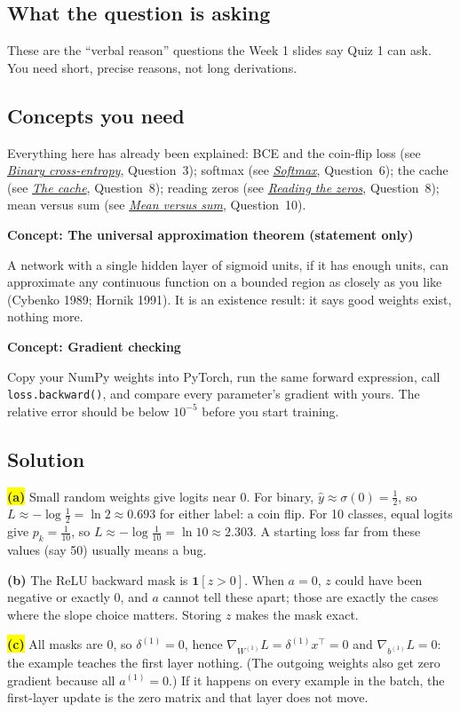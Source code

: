 \documentclass[12pt,a4paper]{article}
\newcommand{\concept}[2]{\par\medskip\phantomsection\label{#1}{\large\bfseries\color{blue!50!black} Concept: #2}\par}
\newcommand{\seeconcept}[3]{(see \hyperref[#1]{\textit{#2}}, Question~#3)}
\newcommand{\hlq}[1]{{\setlength{\fboxsep}{1.5pt}\colorbox{yellow}{#1}}}
\begin{document}
\subsection*{What the question is asking}
These are the ``verbal reason'' questions the Week 1 slides say Quiz 1 can ask. You need short, precise reasons, not long derivations.

\subsection*{Concepts you need}
Everything here has already been explained: BCE and the coin-flip loss \seeconcept{c:bce}{Binary cross-entropy}{3}; softmax \seeconcept{c:softmax}{Softmax}{6}; the cache \seeconcept{c:cache}{The cache}{8}; reading zeros \seeconcept{c:readzeros}{Reading the zeros}{8}; mean versus sum \seeconcept{c:meansum}{Mean versus sum}{10}.

\concept{c:uat}{The universal approximation theorem (statement only)}
A network with a single hidden layer of sigmoid units, if it has enough units, can approximate any continuous function on a bounded region as closely as you like (Cybenko 1989; Hornik 1991). It is an existence result: it says good weights exist, nothing more.

\concept{c:gradcheck}{Gradient checking}
Copy your NumPy weights into PyTorch, run the same forward expression, call \texttt{loss.backward()}, and compare every parameter's gradient with yours. The relative error should be below $10^{-5}$ before you start training.

\subsection*{Solution}
\hlq{\textbf{(a)}} Small random weights give logits near 0. For binary, $\hat y\approx\sigma(0)=\tfrac12$, so $L\approx-\log\tfrac12=\ln2\approx0.693$ for either label: a coin flip. For 10 classes, equal logits give $p_k=\tfrac1{10}$, so $L\approx-\log\tfrac1{10}=\ln10\approx2.303$. A starting loss far from these values (say 50) usually means a bug.

\textbf{(b)} The ReLU backward mask is $\mathbf 1[z>0]$. When $a=0$, $z$ could have been negative or exactly 0, and $a$ cannot tell these apart; those are exactly the cases where the slope choice matters. Storing $z$ makes the mask exact.

\hlq{\textbf{(c)}} All masks are 0, so $\delta^{(1)}=0$, hence $\nabla_{W^{(1)}}L=\delta^{(1)}x^\top=0$ and $\nabla_{b^{(1)}}L=0$: the example teaches the first layer nothing. (The outgoing weights also get zero gradient because all $a^{(1)}=0$.) If it happens on every example in the batch, the first-layer update is the zero matrix and that layer does not move.
\end{document}
